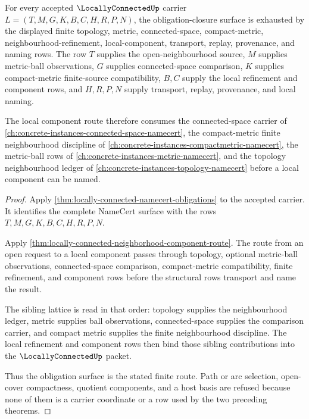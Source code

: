 \begin{theorem}
\label{thm:locally-connected-obligation-closure-surface}
For every accepted $\LocallyConnectedUp$ carrier $L=(T,M,G,K,B,C,H,R,P,N)$, the obligation-closure surface is exhausted by the displayed finite topology, metric, connected-space, compact-metric, neighbourhood-refinement, local-component, transport, replay, provenance, and naming rows. The row $T$ supplies the open-neighbourhood source, $M$ supplies metric-ball observations, $G$ supplies connected-space comparison, $K$ supplies compact-metric finite-source compatibility, $B,C$ supply the local refinement and component rows, and $H,R,P,N$ supply transport, replay, provenance, and local naming.

The local component route therefore consumes the connected-space carrier of \autoref{ch:concrete-instances-connected-space-namecert}, the compact-metric finite neighbourhood discipline of \autoref{ch:concrete-instances-compactmetric-namecert}, the metric-ball rows of \autoref{ch:concrete-instances-metric-namecert}, and the topology neighbourhood ledger of \autoref{ch:concrete-instances-topology-namecert} before a local component can be named.
\end{theorem}
\begin{proof}
Apply \autoref{thm:locally-connected-namecert-obligations} to the accepted carrier. It identifies the complete NameCert surface with the rows $T,M,G,K,B,C,H,R,P,N$.

Apply \autoref{thm:locally-connected-neighborhood-component-route}. The route from an open request to a local component passes through topology, optional metric-ball observations, connected-space comparison, compact-metric compatibility, finite refinement, and component rows before the structural rows transport and name the result.

The sibling lattice is read in that order: topology supplies the neighbourhood ledger, metric supplies ball observations, connected-space supplies the comparison carrier, and compact metric supplies the finite neighbourhood discipline. The local refinement and component rows then bind those sibling contributions into the $\LocallyConnectedUp$ packet.

Thus the obligation surface is the stated finite route. Path or arc selection, open-cover compactness, quotient components, and a host basis are refused because none of them is a carrier coordinate or a row used by the two preceding theorems.
\end{proof}

